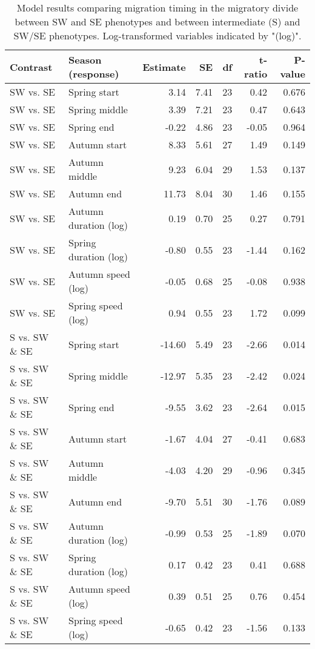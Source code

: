 \documentclass[a4paper, nobind]{templates/ociamthesis}
\begin{document}
\begin{table}[t]

\caption{\label{tab:divide-timing-table}Model results comparing migration timing in the migratory divide between SW and SE phenotypes and between intermediate (S) and SW/SE phenotypes. Log-transformed variables indicated by "(log)".}
\centering
\fontsize{9.5}{11.5}\selectfont
\begin{tabular}{l|l|r|r|r|r|r}
\hline
Contrast & Season (response) & Estimate & SE & df & t-ratio & P-value\\
\hline
SW vs. SE & Spring start & 3.14 & 7.41 & 23 & 0.42 & 0.676\\
\hline
SW vs. SE & Spring middle & 3.39 & 7.21 & 23 & 0.47 & 0.643\\
\hline
SW vs. SE & Spring end & -0.22 & 4.86 & 23 & -0.05 & 0.964\\
\hline
SW vs. SE & Autumn start & 8.33 & 5.61 & 27 & 1.49 & 0.149\\
\hline
SW vs. SE & Autumn middle & 9.23 & 6.04 & 29 & 1.53 & 0.137\\
\hline
SW vs. SE & Autumn end & 11.73 & 8.04 & 30 & 1.46 & 0.155\\
\hline
SW vs. SE & Autumn duration (log) & 0.19 & 0.70 & 25 & 0.27 & 0.791\\
\hline
SW vs. SE & Spring duration (log) & -0.80 & 0.55 & 23 & -1.44 & 0.162\\
\hline
SW vs. SE & Autumn speed (log) & -0.05 & 0.68 & 25 & -0.08 & 0.938\\
\hline
SW vs. SE & Spring speed (log) & 0.94 & 0.55 & 23 & 1.72 & 0.099\\
\hline
S vs. SW \& SE & Spring start & -14.60 & 5.49 & 23 & -2.66 & 0.014\\
\hline
S vs. SW \& SE & Spring middle & -12.97 & 5.35 & 23 & -2.42 & 0.024\\
\hline
S vs. SW \& SE & Spring end & -9.55 & 3.62 & 23 & -2.64 & 0.015\\
\hline
S vs. SW \& SE & Autumn start & -1.67 & 4.04 & 27 & -0.41 & 0.683\\
\hline
S vs. SW \& SE & Autumn middle & -4.03 & 4.20 & 29 & -0.96 & 0.345\\
\hline
S vs. SW \& SE & Autumn end & -9.70 & 5.51 & 30 & -1.76 & 0.089\\
\hline
S vs. SW \& SE & Autumn duration (log) & -0.99 & 0.53 & 25 & -1.89 & 0.070\\
\hline
S vs. SW \& SE & Spring duration (log) & 0.17 & 0.42 & 23 & 0.41 & 0.688\\
\hline
S vs. SW \& SE & Autumn speed (log) & 0.39 & 0.51 & 25 & 0.76 & 0.454\\
\hline
S vs. SW \& SE & Spring speed (log) & -0.65 & 0.42 & 23 & -1.56 & 0.133\\
\hline
\end{tabular}
\end{table}
\end{document}
